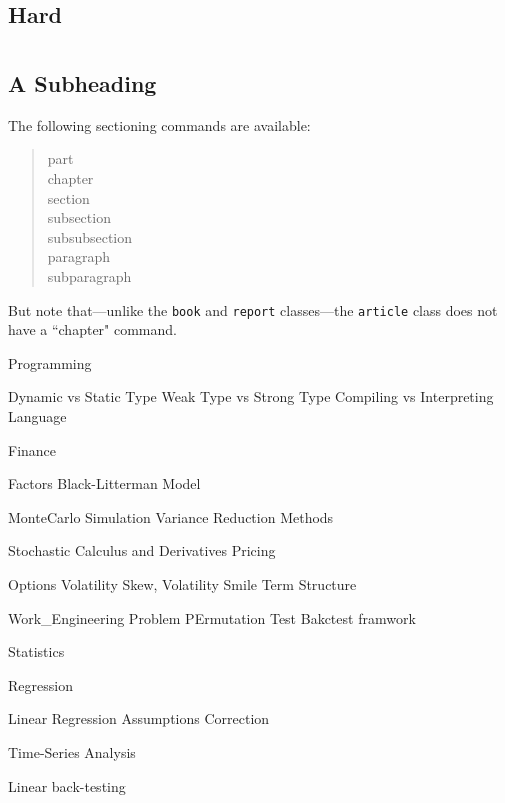 \documentclass[11pt, openany]{book}              %
\begin{document}
\section{Hard}

\chapter{}
 
\section{A Subheading}                  %
The following sectioning commands are available:
\begin{quote}                           %
 part \\                                %
 chapter \\                             %
 section \\ 
 subsection \\ 
 subsubsection \\ 
 paragraph \\ 
 subparagraph 
\end{quote}                             %
But note that---unlike the \texttt{book} and \texttt{report} classes---the
\texttt{article} class does not have a ``chapter" command.



Programming

Dynamic vs Static Type
Weak Type vs Strong Type
Compiling vs Interpreting Language


Finance

Factors
Black-Litterman Model 

MonteCarlo Simulation
Variance Reduction Methods 


Stochastic Calculus and Derivatives Pricing

Options
Volatility Skew, Volatility Smile 
Term Structure 

Work_Engineering Problem
PErmutation Test
Bakctest framwork 




Statistics

Regression

Linear Regression Assumptions Correction

Time-Series Analysis

Linear back-testing 
\end{document}
